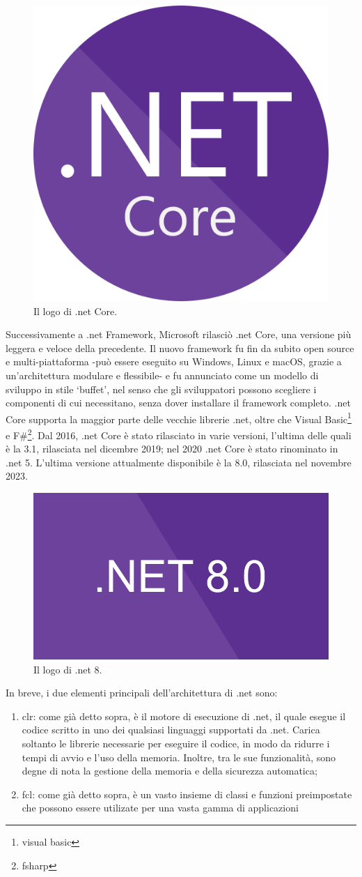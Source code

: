 \begin{figure}[H]
\centering
\includegraphics[width=.4\textwidth]{Images/netcore.png}
\caption{\label{fig:netcore}Il logo di \gls{.net} Core.}
\end{figure}
Successivamente a \gls{.net} Framework, Microsoft rilasciò \gls{.net} Core, una versione più leggera e veloce della precedente. Il nuovo \gls{framework} fu fin da subito \gls{open source} e multi-piattaforma -può essere eseguito su Windows, Linux e macOS, grazie a un'architettura modulare e flessibile- e fu annunciato come un modello di sviluppo in stile `buffet', nel senso che gli sviluppatori possono scegliere i componenti di cui necessitano, senza dover installare il \gls{framework} completo.
\gls{.net} Core supporta la maggior parte delle vecchie librerie \gls{.net}, oltre che Visual Basic\footnote{\glsdesc{visual basic}} e F\#\footnote{\glsdesc{fsharp}}.
Dal 2016, \gls{.net} Core è stato rilasciato in varie versioni, l'ultima delle quali è la 3.1, rilasciata nel dicembre 2019; nel 2020 \gls{.net} Core è stato rinominato in \gls{.net} 5. L'ultima versione attualmente disponibile è la 8.0, rilasciata nel novembre 2023.
\begin{figure}[H]
\centering
\includegraphics[width=.5\textwidth]{Images/net8.png}
\caption{\label{fig:net8}Il logo di \gls{.net} 8.}
\end{figure}
In breve, i due elementi principali dell'architettura di \gls{.net} sono:
\begin{enumerate}
    \item \acrfull{clr}: come già detto sopra, è il motore di esecuzione di \gls{.net}, il quale esegue il codice scritto in uno dei qualsiasi linguaggi supportati da \gls{.net}. Carica soltanto le librerie necessarie per eseguire il codice, in modo da ridurre i tempi di avvio e l'uso della memoria. Inoltre, tra le sue funzionalità, sono degne di nota la gestione della memoria e della sicurezza automatica;
    \item \acrfull{fcl}: come già detto sopra, è un vasto insieme di classi e funzioni preimpostate che possono essere utilizate per una vasta gamma di applicazioni
\end{enumerate}

